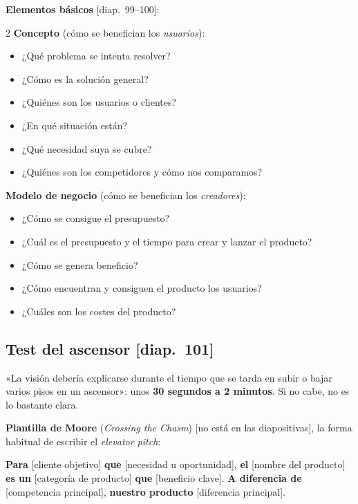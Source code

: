 \documentclass[11pt,a4paper,oneside,openany]{report}
\newcommand{\diap}[1]{\textcolor{mdaPrimary}{\small[diap.~#1]}}
\newcommand{\extra}{\textcolor{mdaOrange}{\small[no está en las diapositivas]}}
\begin{document}
\textbf{Elementos básicos} \diap{99--100}:
\begin{multicols}{2}\small
\textbf{Concepto} (cómo se benefician los \emph{usuarios}):
\begin{itemize}[leftmargin=*,itemsep=1pt]
  \item ¿Qué problema se intenta resolver?
  \item ¿Cómo es la solución general?
  \item ¿Quiénes son los usuarios o clientes?
  \item ¿En qué situación están?
  \item ¿Qué necesidad suya se cubre?
  \item ¿Quiénes son los competidores y cómo nos comparamos?
\end{itemize}
\columnbreak
\textbf{Modelo de negocio} (cómo se benefician los \emph{creadores}):
\begin{itemize}[leftmargin=*,itemsep=1pt]
  \item ¿Cómo se consigue el presupuesto?
  \item ¿Cuál es el presupuesto y el tiempo para crear y lanzar el producto?
  \item ¿Cómo se genera beneficio?
  \item ¿Cómo encuentran y consiguen el producto los usuarios?
  \item ¿Cuáles son los costes del producto?
\end{itemize}
\end{multicols}

\subsection{Test del ascensor \diap{101}}
\begin{teorema}
«La visión debería explicarse durante el tiempo que se tarda en subir o bajar varios pisos en un ascensor»: unos
\textbf{30 segundos a 2 minutos}. Si no cabe, no es lo bastante clara.
\end{teorema}
\textbf{Plantilla de Moore} (\emph{Crossing the Chasm}) \extra, la forma habitual de escribir el \emph{elevator pitch}:
\begin{tcolorbox}[colback=mdaYellowCard,colframe=mdaYellowBorder]
\textbf{Para} [cliente objetivo] \textbf{que} [necesidad u oportunidad], \textbf{el} [nombre del producto] \textbf{es
un} [categoría de producto] \textbf{que} [beneficio clave]. \textbf{A diferencia de} [competencia principal],
\textbf{nuestro producto} [diferencia principal].
\end{tcolorbox}
\end{document}
